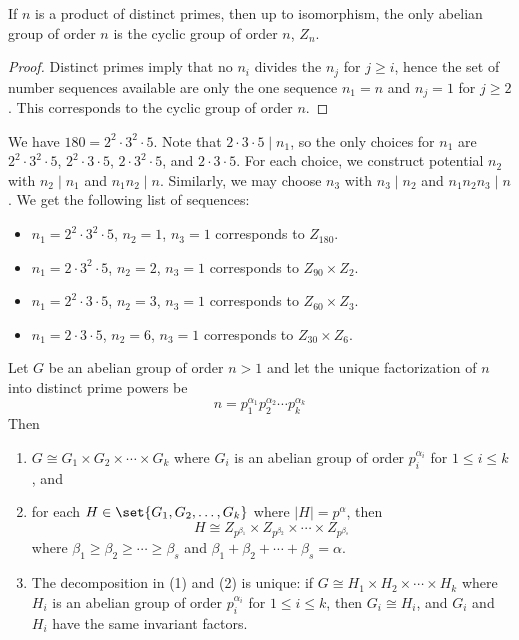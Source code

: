 \begin{cor}
    \label{cor5.4}
    If $n$ is a product of distinct primes, then up to isomorphism, the only abelian group of order $n$ is the cyclic group of order $n$, $Z_n$.
\end{cor}

\begin{proof}
    Distinct primes imply that no $n_i$ divides the $n_j$ for $j \geq i$, hence the set of number sequences available are only the one sequence $n_1 = n$ and $n_j = 1$ for $j \geq 2$. This corresponds to the cyclic group of order $n$.
\end{proof}

\begin{ex}
    We have $180 = 2^2 \cdot 3^2 \cdot 5$. Note that $2 \cdot 3 \cdot 5 \mid n_1$, so the only choices for $n_1$ are $2^2 \cdot 3^2 \cdot 5$, $2^2 \cdot 3 \cdot 5$, $2 \cdot 3^2 \cdot 5$, and $2 \cdot 3 \cdot 5$. For each choice, we construct potential $n_2$ with $n_2 \mid n_1$ and $n_1n_2 \mid n$. Similarly, we may choose $n_3$ with $n_3 \mid n_2$ and $n_1n_2n_3 \mid n$. We get the following list of sequences:
    \begin{itemize}
        \item $n_1 = 2^2 \cdot 3^2 \cdot 5$, $n_2 = 1$, $n_3 = 1$ corresponds to $Z_{180}$.
        \item $n_1 = 2 \cdot 3^2 \cdot 5$, $n_2 = 2$, $n_3 = 1$ corresponds to $Z_{90} \times Z_2$.
        \item $n_1 = 2^2 \cdot 3 \cdot 5$, $n_2 = 3$, $n_3 = 1$ corresponds to $Z_{60} \times Z_3$.
        \item $n_1 = 2 \cdot 3 \cdot 5$, $n_2 = 6$, $n_3 = 1$ corresponds to $Z_{30} \times Z_6$.
    \end{itemize}
\end{ex}

\begin{theo}
    \label{theo5.5}
    Let $G$ be an abelian group of order $n > 1$ and let the unique factorization of $n$ into distinct prime powers be
    \[n = p_1^{\alpha_1}p_2^{\alpha_2} \cdots p_k^{\alpha_k}\]
    Then
    \begin{enumerate}
        \item $G \cong G_1 \times G_2 \times \cdots \times G_k$ where $G_i$ is an abelian group of order $p_i^{\alpha_i}$ for $1 \leq i \leq k$, and
        \item for each $H \in \set{G_1, G_2, \ldots, G_k}$ where $|H| = p^\alpha$, then
        \[H \cong Z_{p^{\beta_1}} \times Z_{p^{\beta_2}} \times \cdots \times Z_{p^{\beta_s}}\]
        where $\beta_1 \geq \beta_2 \geq \cdots \geq \beta_s$ and $\beta_1 + \beta_2 + \cdots + \beta_s = \alpha$.
        \item The decomposition in (1) and (2) is unique: if $G \cong H_1 \times H_2 \times \cdots \times H_k$ where $H_i$ is an abelian group of order $p_i^{\alpha_i}$ for $1 \leq i \leq k$, then $G_i \cong H_i$, and $G_i$ and $H_i$ have the same invariant factors.
    \end{enumerate}
\end{theo}

